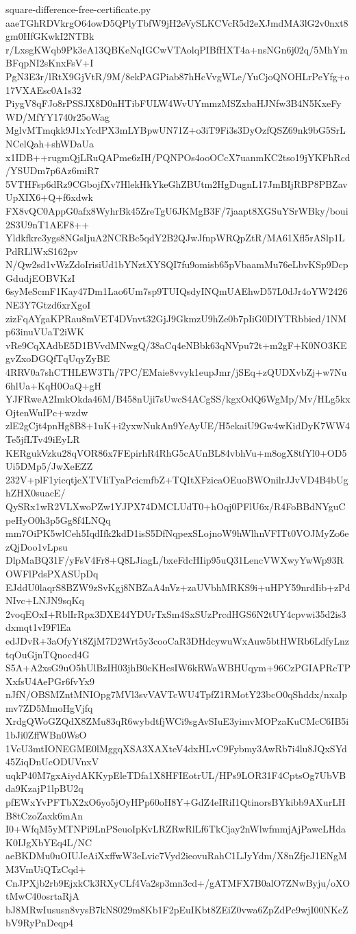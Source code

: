 \documentclass[11pt]{article}
\theoremstyle{definition}
\theoremstyle{remark}
\begin{document}
\begin{filecontents*}[overwrite]{square-difference-free-certificate.py}
aaeTGhRDVkrgO64owD5QPlyTbfW9jH2eVySLKCVcR5d2eXJmdMA3lG2v0nxt8gm0HfGKwkI2NTBk
r/LxsgKWqb9Pk3eA13QBKeNqIGCwVTAolqPIBfHXT4a+nsNGn6j02q/5MhYmBFqpNI2sKnxFsV+I
PgN3E3r/lRtX9GjVtR/9M/8ekPAGPiab87hHcVvgWLe/YuCjoQNOHLrPeYfg+o17VXAEsc0A1s32
PiygV8qFJo8rPSSJX8D0nHTibFULW4WvUYmmzMSZxbaHJNfw3B4N5KxeFyWD/MfYY1740r25oWag
MglvMTmqkk9J1xYcdPX3mLYBpwUN71Z+o3iT9Fi3s3DyOzfQSZ69nk9bG5SrLNCelQah+shWDaUa
x1IDB++rugmQjLRuQAPme6zIH/PQNPOs4ooOCcX7uanmKC2tso19jYKFhRcd/YSUDm7p6Az6miR7
5VTHFsp6dRz9CGbojfXv7HlekHkYkeGhZBUtm2HgDugnL17JmBIjRBP8PBZavUpXIX6+Q+f6xdwk
FX8vQC0AppG0afx8WyhrBk45ZreTgU6JKMgB3F/7jaapt8XGSuYSrWBky/boui2S3U9nT1AEF8++
Yldkfkrc3ygs8NGsIjuA2NCRBc5qdY2B2QJwJfnpWRQpZtR/MA61Xfl5rASlp1LPdRLlWxS162pv
N/Qw2sd1vWzZdoIrisiUd1bYNztXYSQI7fu9omisb65pVbaamMu76eLbvKSp9DcpGdudjEOBVKzI
6syMeScmF1Kay47Dm1Lao6Um7sp9TUIQsdyINQmUAEhwD57L0dJr4oYW2426NE3Y7Gtzd6xrXgoI
zizFqAYgaKPRau8mVET4DVnvt32GjJ9GkmzU9hZe0b7pIiG0DlYTRbbied/1NMp63inuVUaT2iWK
vRe9CqXAdbE5D1BVvdMNwgQ/38aCq4eNBbk63qNVpu72t+m2gF+K0NO3KEgvZxoDGQfTqUqyZyBE
4RRV0a7shCTHLEW3Th/7PC/EMaie8vvyk1eupJmr/jSEq+zQUDXvbZj+w7Nu6hlUa+KqH0OaQ+gH
YJFRweA2ImkOkda46M/B458nUji7sUwcS4ACgSS/kgxOdQ6WgMp/Mv/HLg5kxOjtenWuIPc+wzdw
zlE2gCjt4pnHg8B8+1uK+i2yxwNukAn9YeAyUE/H5ekaiU9Gw4wKidDyK7WW4Te5jfLTv49iEyLR
KERgukVzku28qVOR86x7FEpirhR4RhG5cAUnBL84vbhVu+m8ogX8tfYl0+OD5Ui5DMp5/JwXeEZZ
232V+plF1yicqtjcXTVIiTyaPcicmfbZ+TQItXFzicaOEuoBWOnilrJJvVD4B4bUghZHX0suacE/
QySRx1wR2VLXwoPZw1YJPX74DMCLUdT0+hOqj0PFlU6x/R4FoBBdNYguCpeHyO0h3p5Gg8f4LNQq
mm7OiPK5wlCeh5IqdIfk2kdD1isS5DfNqpexSLojnoW9hWlhnVFITt0VOJMyZo6ezQjDoo1vLpsu
DlpMaBQ31F/yFsV4Fr8+Q8LJiagL/bxeFdcHIip95uQ31LencVWXwyYwWp93ROWFlPdsPXASUpDq
EJddU0laqrS8BZW9zSvKgj8NBZaA4nVz+zaUVbhMRKS9i+uHPY59nrdIib+zPdNIvc+LNJN9sqKq
2voqEOxI+RblIrRpx3DXE44YDUrTxSm4SxSUzPrcdHGS6N2tUY4cpvwi35d2is3dxmqt1vI9FlEa
edJDvR+3aOfyYt8ZjM7D2Wrt5y3cooCaR3DHdcywuWxAuw5btHWRb6LdfyLnztqOuGjnTQnocd4G
S5A+A2xsG9uO5hUlBzIH03jhB0cKHcsIW6kRWaWBHUqym+96CzPGIAPRcTPXxfsU4AePGr6fvYx9
nJfN/OBSMZntMNIOpg7MVl3svVAVTcWU4TpfZ1RMotY23bcO0qShddx/nxalpmv7ZD5MmoHgVjfq
XrdgQWoGZQdX8ZMu83qR6wybdtfjWCi9sgAvSIuE3yimvMOPzaKuCMcC6IB5i1bJi0ZffWBn0WsO
1VcU3mtIONEGME0lMggqXSA3XAXteV4dxHLvC9Fybmy3AwRb7i4lu8JQxSYd45ZiqDnUcODUVnxV
uqkP40M7gxAiydAKKypEleTDfa1X8HFIEotrUL/HPs9LOR31F4CptsOg7UbVBda9KzajP1lpBU2q
pfEWxYvPFTbX2xO6yo5jOyHPp60oH8Y+GdZ4eIRiI1QtinorsBYkibb9AXurLHB8tCzoZaxk6mAn
I0+WfqM5yMTNPi9LnPSeuoIpKvLRZRwRlLf6TkCjay2nWlwfmmjAjPawcLHdaK0IJgXbYEq4L/NC
aeBKDMu0uOIUJeAiXxffwW3eLvic7Vyd2ieovuRahC1LJyYdm/X8nZfjeJ1ENgMM3VmUiQTzCqd+
CnJPXjb2rb9EjxkCk3RXyCLf4Va2sp3mn3cd+/gATMFX7B0alO7ZNwByju/oXOtMwC40osrtaRjA
bJ8MRwIususn8vysB7kNS029m8Kb1F2pEuIKbt8ZEiZ0vwa6ZpZdPc9wjI00NKcZbV9RyPnDeqp4

\end{filecontents*}
\end{document}

